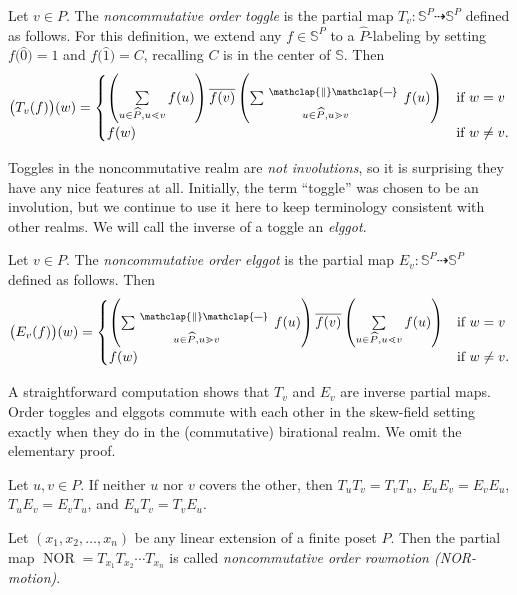 \documentclass[ALCO,ThmDefs,Unicode,epreuves]{cedram}
\newcommand{\defn}[1]{\emph{#1}}
\newcommand{\bigsig}{{\sum}}
\DeclareMathOperator*{\sumpar}{\bigsig^{\ \mathclap{\|}\mathclap{\rule[1.3pt]{6pt}{0.4pt}}}\:}
\newcommand{\bbs}{\mathbb{S}}
\newcommand{\dra}{\dashrightarrow}
\DeclareMathOperator{\NOR}{NOR}
\begin{document}
\begin{defi}
Let $v\in P$. The \defn{noncommutative order toggle} is the partial map $T_v:\bbs^P\dra
\bbs^P$ defined as follows. For this definition, we extend any $f\in\bbs^P$ to a
$\widehat{P}$-labeling by setting $f\big(\widehat{0}\big)=1$ and $f\big( \widehat{1}
\big) = C$, recalling $C$ is in the center of $\bbs$. Then 
\[
\big(T_v(f)\big)(w) = \begin{cases}
\left(\sum\limits_{u\in\widehat{P},u\lessdot v}f(u)\right)
\overline{f(v)} \left(\sumpar\limits_{u\in\widehat{P},u\gtrdot v}f(u)\right)
 &\text{if $w=v$}\\[4pt]
f(w) &\text{if $w\not=v$}.
\end{cases}
\]
\end{defi}

Toggles in the noncommutative realm are \defn{not involutions}, so it is surprising they have any nice features at all. 
Initially, the term ``toggle'' was chosen
to be an involution, but we continue to use it here to keep terminology consistent with other realms.
We will call the inverse of a toggle an \defn{elggot}.

\begin{defi}
Let $v\in P$. The \defn{noncommutative order elggot} is the partial map $E_v:\bbs^P\dra
\bbs^P$ defined as follows.
Then 
\[
\big(E_v(f)\big)(w) = \begin{cases}
\left(\sumpar\limits_{u\in\widehat{P},u\gtrdot v}f(u)\right)
\overline{f(v)} \left(\sum\limits_{u\in\widehat{P},u\lessdot v}f(u)\right)
 &\text{if $w=v$}\\[4pt]
f(w) &\text{if $w\not=v$}.
\end{cases}
\]
\end{defi}
A straightforward computation shows that $T_{v}$ and $E_{v}$ are inverse partial
maps. 
Order toggles and elggots commute with each other in the skew-field setting exactly when they do 
in the (commutative) birational realm. We omit the elementary proof.

\begin{prop}
Let $u,v\in P$. If neither $u$ nor $v$ covers the other, then
$T_uT_v=T_vT_u$, $E_uE_v=E_vE_u$, $T_uE_v=E_vT_u$, and
$E_uT_v=T_vE_u$.
\end{prop}

\begin{defi}
Let $(x_1,x_2,\dots,x_n)$ be any linear extension of a finite poset $P$. Then the partial
map $\NOR=T_{x_1} T_{x_2} \cdots T_{x_n}$ is called \defn{noncommutative order rowmotion
(NOR-motion)}. 
\end{defi}
\end{document}

